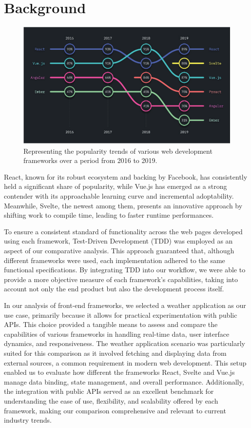 \section{Background}

\begin{figure}[!htbp]
\centering
\includegraphics[width=\linewidth]{figs/popularity.png}
\caption{Representing the popularity trends of various web development frameworks over a period from 2016 to 2019.}
\label{fig:popularity}
\end{figure}


React, known for its robust ecosystem and backing by Facebook, has consistently held a significant share of popularity, while Vue.js has emerged as a strong contender with its approachable learning curve and incremental adoptability. Meanwhile, Svelte, the newest among them, presents an innovative approach by shifting work to compile time, leading to faster runtime performances.

To ensure a consistent standard of functionality across the web pages developed using each framework, Test-Driven Development (TDD) was employed as an aspect of our comparative analysis. This approach guaranteed that, although different frameworks were used, each implementation adhered to the same functional specifications. By integrating TDD into our workflow, we were able to provide a more objective measure of each framework's capabilities, taking into account not only the end product but also the development process itself.

In our analysis of front-end frameworks, we selected a weather application as our use case, primarily because it allows for practical experimentation with public APIs. This choice provided a tangible means to assess and compare the capabilities of various frameworks in handling real-time data, user interface dynamics, and responsiveness. The weather application scenario was particularly suited for this comparison as it involved fetching and displaying data from external sources, a common requirement in modern web development. This setup enabled us to evaluate how different the frameworks React, Svelte and Vue.js manage data binding, state management, and overall performance. Additionally, the integration with public APIs served as an excellent benchmark for understanding the ease of use, flexibility, and scalability offered by each framework, making our comparison comprehensive and relevant to current industry trends.

